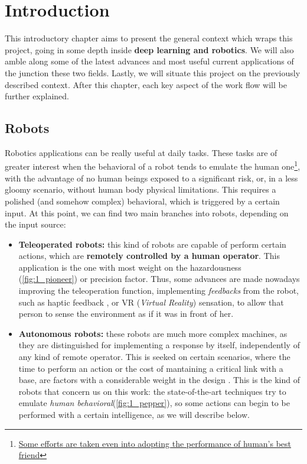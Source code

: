 \chapter{Introduction}
This introductory chapter aims to present the general context which wraps this project, going in some depth inside \textbf{deep learning and robotics}. We will also amble along some of the latest advances and most useful current applications of the junction  these two fields. Lastly, we will situate this project on the previously described context. After this chapter, each key aspect of the work flow will be further explained.\\

\section{Robots}

Robotics applications can be really useful at daily tasks. These tasks are of greater interest when the behavioral of a robot tends to emulate the human one\footnote{\href{https://www.engadget.com/2018/01/08/new-sony-aibo-first-impressions/}{Some efforts are taken even into adopting the performance of human's best friend}}, with the advantage of no human beings exposed to a significant risk, or, in a less gloomy scenario, without human body physical limitations. This requires a polished (and somehow complex) behavioral, which is triggered by a certain input. At this point, we can find two main branches into robots, depending on the input source:
\begin{itemize}
	\item \textbf{Teleoperated robots:} this kind of robots are capable of perform certain actions, which are \textbf{remotely controlled by a human operator}. This application is the one with most weight on the hazardousness (\autoref{fig:1_pioneer}) \cite{chernobyl-robot} or precision \cite{teleop-surgery} factor. Thus, some advances are made nowadays improving the teleoperation function, implementing \emph{feedbacks} from the robot, such as haptic feedback \cite{teleop-haptic}, or VR (\emph{Virtual Reality}) sensation, to allow that person to sense the environment as if it was in front of her.	
	
	\item \textbf{Autonomous robots:} these robots are much more complex machines, as they are distinguished for implementing a response by itself, independently of any kind of remote operator. This is seeked on certain scenarios, where the time to perform an action or the cost of mantaining a critical link with a base, are factors with a considerable weight in the design \cite{ai-space}. This is the kind of robots that concern us on this work: the state-of-the-art techniques try to emulate \emph{human behavioral}(\autoref{fig:1_pepper}), so some actions can begin to be performed with a certain intelligence, as we will describe below.
\end{itemize}


